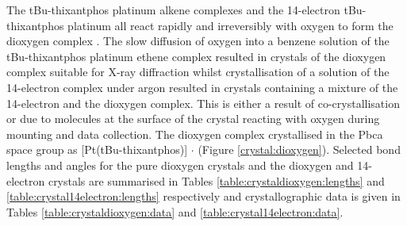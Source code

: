 
The tBu-thixantphos platinum alkene complexes and the 14-electron tBu-thixantphos platinum all react rapidly and irreversibly with oxygen to form the dioxygen complex .  The slow diffusion of oxygen into a benzene solution of the tBu-thixantphos platinum ethene complex resulted in crystals of the dioxygen complex suitable for X-ray diffraction whilst crystallisation of a solution of the 14-electron complex under argon resulted in crystals containing a mixture of the 14-electron and the dioxygen complex.  This is either a result of co-crystallisation or due to molecules at the surface of the crystal reacting with oxygen during mounting and data collection.  The dioxygen complex crystallised in the Pbca space group as [Pt(tBu-thixantphos)] $\cdot{}$  (Figure \ref{crystal:dioxygen}).  Selected bond lengths and angles for the pure dioxygen crystals and the dioxygen and 14-electron crystals are summarised in Tables \ref{table:crystaldioxygen:lengths} and \ref{table:crystal14electron:lengths} respectively and crystallographic data is given in Tables \ref{table:crystaldioxygen:data} and \ref{table:crystal14electron:data}.



